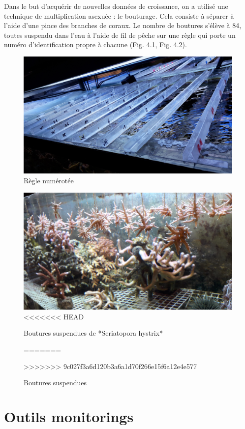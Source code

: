 \documentclass[]{report}
\begin{document}
Dans le but d'acquérir de nouvelles données de croissance, on a utilisé
une technique de multiplication asexuée : le bouturage. Cela consiste à
séparer à l'aide d'une pince des branches de coraux. Le nombre de
boutures s'élève à 84, toutes suspendu dans l'eau à l'aide de fil de
pêche sur une règle qui porte un numéro d'identification propre à
chacune (Fig. 4.1, Fig. 4.2).

\begin{figure}[h!]
\includegraphics[]{../image/regle.jpg}
\caption{Règle numérotée}
\end{figure}

\begin{figure}[h!]
\includegraphics[]{../image/boutures.jpg}
<<<<<<< HEAD
\caption{Boutures suspendues de *Seriatopora hystrix*}
=======
\caption{Boutures suspendues}
>>>>>>> 9c027f3a6d120b3a6a1d70f266e15f6a12e4e577
\end{figure}

\section{Outils monitorings}\label{outils-monitorings}
\end{document}

